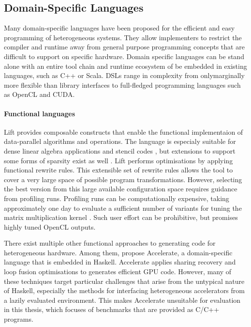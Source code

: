 \subsection{Domain-Specific Languages}

    Many domain-specific languages have been proposed for the efficient and
    easy programming of heterogeneous systems.
    They allow implementers to restrict the compiler and runtime away from
    general purpose programming concepts that are difficult to support on
    specific hardware.
    Domain specific languages can be stand alone with an entire tool chain and
    runtime ecosystem of be embedded in existing languages, such as C++ or
    Scala.
    DSLs range in complexity from onlymarginally more flexible than library
    interfaces to full-fledged programming languages such as OpenCL and CUDA.

    \paragraph*{Functional languages}
    Lift \citep{steuwer15rewrite} provides composable constructs that enable the
    functional implementaion of data-parallel algorithms and operations.
    The language is especialy suitable for dense linear algebra applications
    \citep{Steuwer:2016:MMB:2968455.2968521} and stencil codes
    \citep{Hagedorn:2018:HPS:3179541.3168824}, but extensions to support
    some forms of sparsity exist as well
    \citep{Pizzuti:2019:PAA:3331553.3342614}.
    Lift performs optimisations by applying functional rewrite rules.
    This extensible set of rewrite rules allows the tool to cover a very large
    space of possible program transformations.
    However, selecting the best version from this large available configuration
    space requires guidance from profiling runs.
    Profiling runs can be computationally expensive, taking approximately
    one day to evaluate a sufficient number of variants for tuning the matrix
    multiplication kernel \citep{Steuwer:2016:MMB:2968455.2968521}.
    Such user effort can be prohibitive, but promises highly tuned OpenCL
    outputs.

    There exist multiple other functional approaches to generating code for
    heterogeneous hardware.
    Among them, \citet{chakravarty11accelerating,mcdonell13optimising} propose
    Accelerate, a domain-specific language that is embedded in Haskell.
    Accelerate applies sharing recovery and loop fusion optimisations to
    generates efficient GPU code.
    However, many of these techniques target particular challenges that arise
    from the untypical nature of Haskell, especially the methods for interfacing
    heterogeneous accelerators from a lazily evaluated environment.
    This makes Accelerate unsuitable for evaluation in this thesis, which
    focuses of benchmarks that are provided as C/C++ programs.



